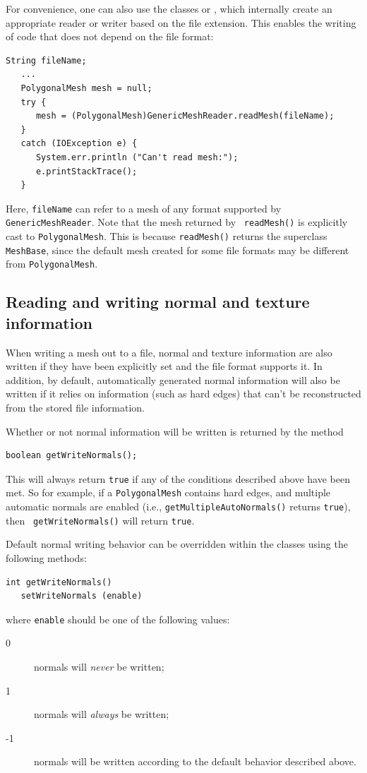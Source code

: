For convenience, one can also use the classes
 or
, which internally
create an appropriate reader or writer based on the file
extension. This enables the writing of code
that does not depend on the file format:
%
\begin{lstlisting}[]
   String fileName;
   ...
   PolygonalMesh mesh = null;
   try {
      mesh = (PolygonalMesh)GenericMeshReader.readMesh(fileName);
   }
   catch (IOException e) {
      System.err.println ("Can't read mesh:");
      e.printStackTrace();
   }
\end{lstlisting}
%
Here, {\tt fileName} can refer to a mesh of any format supported by
{\tt GenericMeshReader}. Note that the mesh returned by {\tt
readMesh()} is explicitly cast to {\tt PolygonalMesh}.  This is
because {\tt readMesh()} returns the superclass {\tt MeshBase}, since
the default mesh created for some file formats may be different from
{\tt PolygonalMesh}.

\subsection{Reading and writing normal and texture information}

When writing a mesh out to a file, normal and texture information are
also written if they have been explicitly set and the file format
supports it. In addition, by default, automatically generated normal
information will also be written if it relies on information (such as
hard edges) that can't be reconstructed from the stored file
information.

Whether or not normal information will be written is returned by the
method
\begin{lstlisting}[]
   boolean getWriteNormals();
\end{lstlisting}
%
This will always return {\tt true} if any of the conditions described
above have been met.  So for example, if a {\tt PolygonalMesh}
contains hard edges, and multiple automatic normals are enabled (i.e.,
{\tt getMultipleAutoNormals()} returns {\tt true}), then {\tt
getWriteNormals()} will return {\tt true}.

Default normal writing behavior can be overridden within 
the  classes
using the following methods:
\begin{lstlisting}[]
   int getWriteNormals()
   setWriteNormals (enable)
\end{lstlisting}
%
where {\tt enable} should be one of the following values:
\begin{description}
\item[ 0] normals will {\it never} be written;
\item[ 1] normals will {\it always} be written;
\item[-1] normals will be written according to the default behavior
described above.
\end{description}

